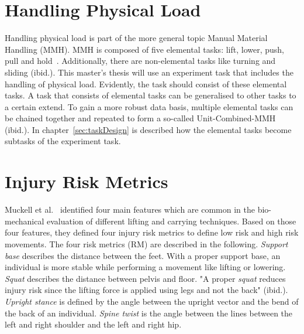 \section{Handling Physical Load}
\label{section:handlingphysicalload}
Handling physical load is part of the more general topic Manual Material Handling (MMH). MMH is composed of five elemental tasks: lift, lower, push, pull and hold~\cite{mmh}. Additionally, there are non-elemental tasks like turning and sliding (ibid.). This master's thesis will use an experiment task that includes the handling of physical load. Evidently, the task should consist of these elemental tasks. A task that consists of elemental tasks can be generalised to other tasks to a certain extend. To gain a more robust data basis, multiple elemental tasks can be chained together and repeated to form a so-called Unit-Combined-MMH (ibid.). In chapter~\ref{sec:taskDesign} is described how the elemental tasks become subtasks of the experiment task.

\section{Injury Risk Metrics}
\label{section:rm}
Muckell et al.~\cite{muckell} identified four main features which are common in the bio-mechanical evaluation of different lifting and carrying techniques. Based on those four features, they defined four injury risk metrics to define low risk and high risk movements. The four risk metrics (RM) are described in the following. \textit{Support base} describes the distance between the feet. With a proper support base, an individual is more stable while performing a movement like lifting or lowering. \textit{Squat} describes the distance between pelvis and floor. "A proper \textit{squat} reduces injury risk since the lifting force is applied using legs and not the back" (ibid.). \textit{Upright stance} is defined by the angle between the upright vector and the bend of the back of an individual. \textit{Spine twist} is the angle between the lines between the left and right shoulder and the left and right hip.

